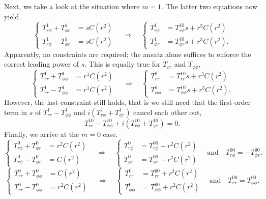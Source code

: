 \documentclass[a4paper, 11pt]{article}
\begin{document}
Next, we take a look at the situation where $m=1$. The latter two equations now yield
\[
\left\{\begin{aligned}
    T_{r\phi}^1 + T_{\phi r}^1 &= s C(r^2) \\ 
    T_{r\phi}^1 - T_{\phi r}^1 &= s C(r^2)
\end{aligned}\right. \quad \Longrightarrow\quad 
\left\{\begin{aligned}
    T_{r\phi}^1 &= T_{r\phi}^{10} s + r^{3} C(r^2) \\ 
    T_{\phi r}^1 &= T_{\phi r}^{10} s + r^{3} C(r^2). 
\end{aligned}\right.
\]
Apparently, no constraints are required; the ansatz alone suffices to enforce the correct leading power of $s$. This is equally true for $T_{rr}$ and $T_{\phi\phi}$,
\[
\left\{\begin{aligned}
    T_{rr}^1 + T_{\phi \phi}^1 &= r^{1} C(r^2) \\ 
    T_{rr}^1 - T_{\phi \phi}^1 &= r^{1} C(r^2)
\end{aligned}\right. \quad \Longrightarrow\quad 
\left\{\begin{aligned}
    T_{rr}^1 &= T_{rr}^{10} s + r^{3} C(r^2) \\ 
    T_{\phi \phi}^1 &= T_{\phi\phi}^{10} s + r^{3} C(r^2) .
\end{aligned}\right.
\]
However, the last constraint still holds, that is we still need that the first-order term in $s$ of $T_{rr}^1 - T_{\phi\phi}^1$ and $i \left(T_{r\phi}^1 + T_{\phi r}^1\right)$ cancel each other out,
\[
    T_{rr}^{10} - T_{\phi\phi}^{10} + i \left(T_{r\phi}^{10} + T_{\phi r}^{10}\right) = 0.
\]
Finally, we arrive at the $m=0$ case.
\[
\left\{\begin{aligned}
    T_{r\phi}^0 + T_{\phi r}^0 &= r^2 C(r^2) \\ 
    T_{r\phi}^0 - T_{\phi r}^0 &= C(r^2)
\end{aligned}\right. \quad \Longrightarrow\quad 
\left\{\begin{aligned}
    T_{r\phi}^0 &= T_{r\phi}^{00} + r^2 C(r^2) \\ 
    T_{\phi r}^0 &= T_{\phi r}^{00} + r^2 C(r^2) 
\end{aligned}\right. \quad \mathrm{and} \quad T_{r\phi}^{00} = -T_{\phi r}^{00}.
\]
\[
\left\{\begin{aligned}
    T_{rr}^0 + T_{\phi \phi}^0 &= C(r^2) \\ 
    T_{rr}^0 - T_{\phi \phi}^0 &= r^2 C(r^2)
\end{aligned}\right. \quad \Longrightarrow\quad 
\left\{\begin{aligned}
    T_{rr}^0 &= T_{rr}^{00} + r^2 C(r^2) \\ 
    T_{\phi \phi}^0 &= T_{\phi\phi}^{00} + r^{2} C(r^2) 
\end{aligned}\right. \quad \mathrm{and} \quad T_{rr}^{00} = T_{\phi\phi}^{00}.
\]
\end{document}
